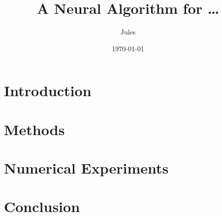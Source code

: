 \documentclass{article}
\title{A Neural Algorithm for \dots}
\author{Jules}
\date{\today}
\begin{document}
\maketitle

\begin{abstract}
\end{abstract}

\section{Introduction}

\section{Methods}

\section{Numerical Experiments}

\section{Conclusion}



\end{document}
